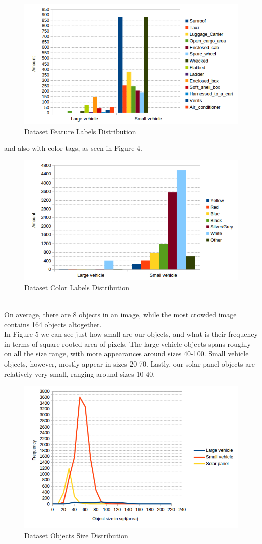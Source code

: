 \documentclass[]{article}
\begin{document}
\begin{figure}[!h]
\centering
\includegraphics[width=0.7\linewidth]{"charts/Dataset Feature Labels Distribution"}
\caption{Dataset Feature Labels Distribution}
\label{fig:Dataset Feature Labels Distribution}
\end{figure}
and also with color tags, as seen in Figure 4.
\begin{figure}[!h]
\centering
\includegraphics[width=0.7\linewidth]{"charts/Dataset Color Labels Distribution"}
\caption{Dataset Color Labels Distribution}
\label{fig:Dataset Color Labels Distribution}
\end{figure}
\\
On average, there are 8 objects in an image, while the most crowded image contains 164 objects altogether.\\

In Figure 5 we can see just how small are our objects, and what is their frequency in terms of square rooted area of pixels. The large vehicle objects spans roughly on all the size range, with more appearances around sizes 40-100. Small vehicle objects, however, mostly appear in sizes 20-70. Lastly, our solar panel objects are relatively very small, ranging around sizes 10-40.
\begin{figure}[!h]
\centering
\includegraphics[width=0.7\linewidth]{"charts/Dataset Objects Size Distribution"}
\caption{Dataset Objects Size Distribution}
\label{fig:Dataset Objects Size Distribution}
\end{figure}
\end{document}
